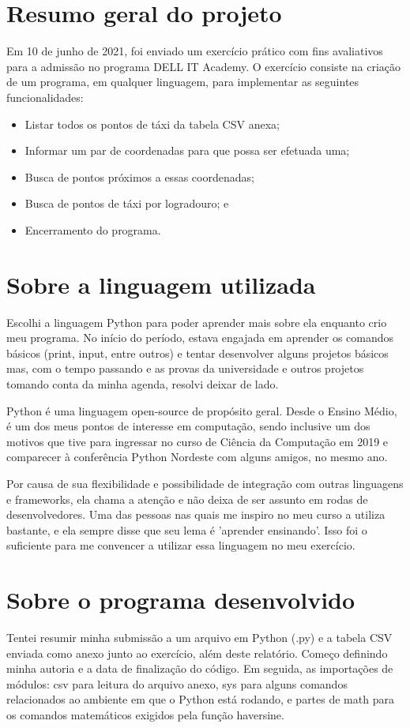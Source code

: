 \section{Resumo geral do projeto}
Em 10 de junho de 2021, foi enviado um exercício prático com fins avaliativos para a admissão no programa DELL IT Academy. O exercício consiste na criação de um programa, em qualquer linguagem, para implementar as seguintes funcionalidades:
\begin{itemize}
    \item Listar todos os pontos de táxi da tabela CSV anexa;
    \item Informar um par de coordenadas para que possa ser efetuada uma;
    \item Busca de pontos próximos a essas coordenadas;
    \item Busca de pontos de táxi por logradouro; e
    \item Encerramento do programa.
\end{itemize}


\section{Sobre a linguagem utilizada}
Escolhi a linguagem Python para poder aprender mais sobre ela enquanto crio meu programa. No início do período, estava engajada em aprender os comandos básicos (print, input, entre outros) e tentar desenvolver alguns projetos básicos mas, com o tempo passando e as provas da universidade e outros projetos tomando conta da minha agenda, resolvi deixar de lado.

Python é uma linguagem open-source de propósito geral. Desde o Ensino Médio, é um dos meus pontos de interesse em computação, sendo inclusive um dos motivos que tive para ingressar no curso de Ciência da Computação em 2019 e comparecer à conferência Python Nordeste com alguns amigos, no mesmo ano.

Por causa de sua flexibilidade e possibilidade de integração com outras linguagens e frameworks, ela chama a atenção e não deixa de ser assunto em rodas de desenvolvedores. Uma das pessoas nas quais me inspiro no meu curso a utiliza bastante, e ela sempre disse que seu lema é 'aprender ensinando'. Isso foi o suficiente para me convencer a utilizar essa linguagem no meu exercício.


\section{Sobre o programa desenvolvido}
Tentei resumir minha submissão a um arquivo em Python (.py) e a tabela CSV enviada como anexo junto ao exercício, além deste relatório. Começo definindo minha autoria e a data de finalização do código. Em seguida, as importações de módulos: csv para leitura do arquivo anexo, sys para alguns comandos relacionados ao ambiente em que o Python está rodando, e partes de math para os comandos matemáticos exigidos pela função haversine. 

